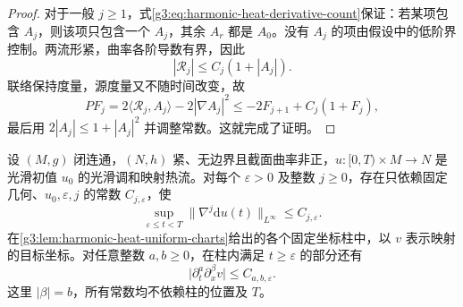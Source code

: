 \begin{proof}
	对于一般 \(j\ge1\)，式\eqref{g3:eq:harmonic-heat-derivative-count}保证：若某项包含 \(A_j\)，则该项只包含一个 \(A_j\)，其余 \(A_r\) 都是 \(A_0\)。没有 \(A_j\) 的项由假设中的低阶界控制。两流形紧，曲率各阶导数有界，因此
	\[
		|\mathcal R_j|\le C_j(1+|A_j|).
	\]
	联络保持度量，源度量又不随时间改变，故
	\[
		PF_j=2\langle\mathcal R_j,A_j\rangle-2|\nabla A_j|^2
		\le-2F_{j+1}+C_j(1+F_j),
	\]
	最后用 \(2|A_j|\le1+|A_j|^2\) 并调整常数。这就完成了证明。
\end{proof}

\begin{theorem}\label{g3:thm:harmonic-heat-uniform-derivatives}
	设 \((M,g)\) 闭连通，\((N,h)\) 紧、无边界且截面曲率非正，\(u:[0,T)\times M\to N\) 是光滑初值 \(u_0\) 的光滑调和映射热流。对每个 \(\varepsilon>0\) 及整数 \(j\ge0\)，存在只依赖固定几何、\(u_0,\varepsilon,j\) 的常数 \(C_{j,\varepsilon}\)，使
	\begin{equation}\label{g3:eq:harmonic-heat-uniform-spatial-derivatives}
		\sup_{\varepsilon\le t<T}\|\nabla^j\mathrm du(t)\|_{L^\infty}
		\le C_{j,\varepsilon}.
	\end{equation}
	在\cref{g3:lem:harmonic-heat-uniform-charts}给出的各个固定坐标柱中，以 \(v\) 表示映射的目标坐标。对任意整数 \(a,b\ge0\)，在柱内满足 \(t\ge\varepsilon\) 的部分还有
	\begin{equation}\label{g3:eq:harmonic-heat-uniform-space-time-derivatives}
		\bigl|\partial_t^a\partial_x^\beta v\bigr|
		\le C_{a,b,\varepsilon}.
	\end{equation}
	这里 \(|\beta|=b\)，所有常数均不依赖柱的位置及 \(T\)。
\end{theorem}

